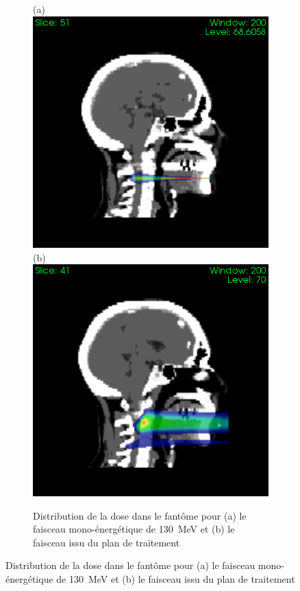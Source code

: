 \documentclass[11pt,a4paper,oldfontcommands]{memoir}
\begin{document}
\begin{figure}
\begin{figure}[h!]
\centering
\subfloat(a){\includegraphics[scale=0.37]{CT/130/profil.png}}
\subfloat(b){\includegraphics[scale=0.37]{CT/TPS/profil.png}}
\caption{Distribution de la dose dans le fantôme pour (a) le faisceau mono-énergétique de 130~MeV et (b) le faisceau issu du plan de traitement}
\label{profil}
\end{figure}




\end{figure}
\end{document}
